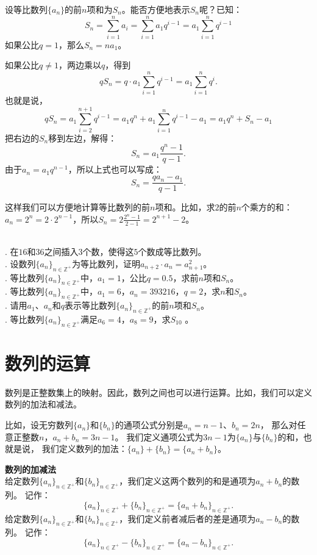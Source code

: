 \documentclass[12pt,UTF8,fontset=none]{ctexbook}
\begin{document}
设等比数列$\{a_n\}$的前$n$项和为$S_n$。能否方便地表示$S_n$呢？已知：
$$ S_n = \sum_{i=1}^n a_i = \sum_{i=1}^n a_1 q^{i-1} = a_1 \sum_{i=1}^n q^{i-1} $$
如果公比$q = 1$，那么$S_n = na_1$。

如果公比$q \neq 1$，两边乘以$q$，得到
$$ q S_n = q \cdot a_1 \sum_{i=1}^n q^{i-1} = a_1 \sum_{i=1}^n q^{i}.$$
也就是说，
$$ qS_n = a_1 \sum_{i=2}^{n+1} q^{i-1} = a_1 q^n + a_1 \sum_{i=1}^{n} q^{i-1} - a_1  = a_1 q^n + S_{n} - a_1$$
把右边的$S_n$移到左边，解得：
$$ S_n = a_1\frac{q^n - 1}{q - 1}. $$
由于$a_n = a_1q^{n-1}$，所以上式也可以写成：
$$ S_n = \frac{q a_n - a_1}{q - 1}. $$

这样我们可以方便地计算等比数列的前$n$项和。比如，求$2$的前$n$个乘方的和：$a_n = 2^{n} = 2\cdot 2^{n-1}$，所以$S_n =2\frac{2^{n}-1}{2-1} = 2^{n+1} - 2$。
\begin{xt}
    \mbox{} \\
    . 在$16$和$36$之间插入$3$个数，使得这$5$个数成等比数列。 \\
    . 设数列$\{a_n\}_{n\in\mathbb{Z}^+}$为等比数列，证明$a_{n+2} \cdot a_n = a_{n+1}^2$。 \\
    . 等比数列$\{a_n\}_{n\in\mathbb{Z}^+}$中，$a_1 = 1$，公比$q = 0.5$，求前$n$项和$S_n$。 \\
    . 等比数列$\{a_n\}_{n\in\mathbb{Z}^+}$中，$a_1 = 6$，$a_n = 393216$，$q = 2$，求$n$和$S_n$。 \\
    . 请用$a_1$、$a_n$和$q$表示等比数列$\{a_n\}_{n\in\mathbb{Z}^+}$的前$n$项和$S_n$。 \\
    . 等比数列$\{a_n\}_{n\in\mathbb{Z}^+}$满足$a_6 = 4$，$a_{8}=9$，求$S_{10}$ 。
\end{xt}

\section{数列的运算}

数列是正整数集上的映射。因此，数列之间也可以进行运算。比如，我们可以定义数列的加法和减法。

比如，设无穷数列$\{a_n\}$和$\{b_n\}$的通项公式分别是$a_n = n - 1$、$b_n = 2n$，
那么对任意正整数$n$，$a_n + b_n = 3n - 1$。
我们定义通项公式为$3n - 1$为$\{a_n\}$与$\{b_n\}$的和，也就是说，
我们定义数列的加法：$\{a_n\} + \{b_n\} = \{a_n + b_n\}$。

\begin{df}\textbf{数列的加减法}\\
    给定数列$\{a_n\}_{n\in\mathbb{Z}^+}$和$\{b_n\}_{n\in\mathbb{Z}^+}$，我们定义这两个数列的和是通项为$a_n + b_n$的数列。
    记作：
    $$ \{a_n\}_{n\in\mathbb{Z}^+} + \{b_n\}_{n\in\mathbb{Z}^+} = \{a_n + b_n\}_{n\in\mathbb{Z}^+}.$$
    给定数列$\{a_n\}_{n\in\mathbb{Z}^+}$和$\{b_n\}_{n\in\mathbb{Z}^+}$，我们定义前者减后者的差是通项为$a_n - b_n$的数列。
    记作：
    $$ \{a_n\}_{n\in\mathbb{Z}^+} - \{b_n\}_{n\in\mathbb{Z}^+} = \{a_n - b_n\}_{n\in\mathbb{Z}^+}.$$    
\end{df}
\end{document}
